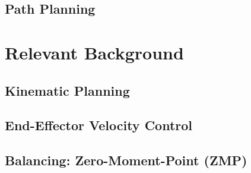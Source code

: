 		\subsection{Path Planning}\label{sec:srm}
		
		

		
%		
		
	\section{Relevant Background}\label{sec:background}
    		
    	
		\subsection{Kinematic Planning}
			
		\subsection{End-Effector Velocity Control}
			
%			
		\subsection{Balancing: Zero-Moment-Point (ZMP)}
			
	

%
%
%
%
%
%

%
%
%

%
%
%
